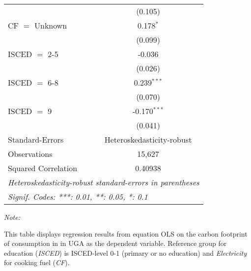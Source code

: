 \begin{table}[htbp!]
\begin{adjustbox}{width = 1\textwidth, max height = 0.95\textheight, center}
\begin{threeparttable}[b]
\begin{tabular}{lc}
                                & (0.105)\\   
            CF $=$ Unknown      & 0.178$^{*}$\\   
                                & (0.099)\\   
            ISCED $=$ 2-5       & -0.036\\   
                                & (0.026)\\   
            ISCED $=$ 6-8       & 0.239$^{***}$\\   
                                & (0.070)\\   
            ISCED $=$ 9         & -0.170$^{***}$\\   
                                & (0.041)\\   
            \midrule 
            Standard-Errors     & Heteroskedasticity-robust \\   
            Observations        & 15,627\\  
            Squared Correlation & 0.40938\\  
            \midrule \midrule
            \multicolumn{2}{l}{\emph{Heteroskedasticity-robust standard-errors in parentheses}}\\
            \multicolumn{2}{l}{\emph{Signif. Codes: ***: 0.01, **: 0.05, *: 0.1}}\\
         \end{tabular}
         
         \begin{tablenotes}\item \medskip \textit{Note:}
            \item This table displays regression results from equation OLS on the carbon footprint of consumption in  in UGA as the dependent variable.  Reference group for education (\textit{ISCED}) is ISCED-level 0-1 (primary or no education) and \textit{Electricity} for cooking fuel (\textit{CF}).
         \end{tablenotes}
      \end{threeparttable}
   \end{adjustbox}
\end{table}


